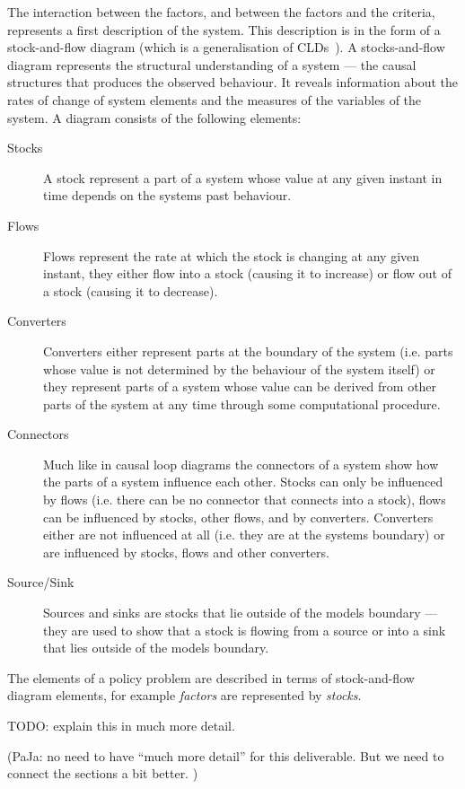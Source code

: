 The interaction between the factors, and between the factors and the
criteria, represents a first description of the system.
%
This description is in the form of a stock-and-flow diagram (which is
a generalisation of \aclp{CLD}~\cite{burns}).
%
A stocks-and-flow diagram represents the structural understanding of a
system --- the causal structures that produces the observed behaviour.
%
It reveals information about the rates of change of system elements
and the measures of the variables of the system.
%
A diagram consists of the following elements:
\begin{description}
\item[Stocks] A stock represent a part of a system whose value at any
  given instant in time depends on the systems past behaviour.
\item[Flows] Flows represent the rate at which the stock is changing
  at any given instant, they either flow into a stock (causing it to
  increase) or flow out of a stock (causing it to decrease).
\item[Converters] Converters either represent parts at the boundary of
  the system (i.e. parts whose value is not determined by the
  behaviour of the system itself) or they represent parts of a system
  whose value can be derived from other parts of the system at any
  time through some computational procedure.
\item[Connectors] Much like in causal loop diagrams the connectors of
  a system show how the parts of a system influence each other.
%
  Stocks can only be influenced by flows (i.e. there can be no
  connector that connects into a stock), flows can be influenced by
  stocks, other flows, and by converters.
%
  Converters either are not influenced at all (i.e. they are at the
  systems boundary) or are influenced by stocks, flows and other
  converters.
\item[Source/Sink] Sources and sinks are stocks that lie outside of
  the models boundary --- they are used to show that a stock is
  flowing from a source or into a sink that lies outside of the models
  boundary.
\end{description}
The elements of a policy problem are described in terms of
stock-and-flow diagram elements, for example \emph{factors} are
represented by \emph{stocks}.

TODO: explain this in much more detail.

(PaJa: no need to have ``much more detail'' for this deliverable. But
we need to connect the sections a bit better. )

